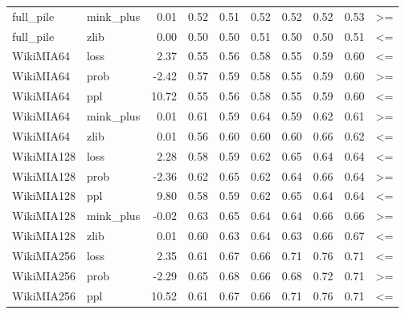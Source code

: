 \begin{tabular}{llrrrrrrrl}
 full\_pile & mink\_plus &           0.01 &           0.52 &     0.51 &      0.52 &          0.52 &    0.52 &     0.53 &                  >= \\
 full\_pile &      zlib &           0.00 &           0.50 &     0.50 &      0.51 &          0.50 &    0.50 &     0.51 &                  <= \\
 WikiMIA64 &      loss &           2.37 &           0.55 &     0.56 &      0.58 &          0.55 &    0.59 &     0.60 &                  <= \\
 WikiMIA64 &      prob &          -2.42 &           0.57 &     0.59 &      0.58 &          0.55 &    0.59 &     0.60 &                  >= \\
 WikiMIA64 &       ppl &          10.72 &           0.55 &     0.56 &      0.58 &          0.55 &    0.59 &     0.60 &                  <= \\
 WikiMIA64 & mink\_plus &           0.01 &           0.61 &     0.59 &      0.64 &          0.59 &    0.62 &     0.61 &                  >= \\
 WikiMIA64 &      zlib &           0.01 &           0.56 &     0.60 &      0.60 &          0.60 &    0.66 &     0.62 &                  <= \\
WikiMIA128 &      loss &           2.28 &           0.58 &     0.59 &      0.62 &          0.65 &    0.64 &     0.64 &                  <= \\
WikiMIA128 &      prob &          -2.36 &           0.62 &     0.65 &      0.62 &          0.64 &    0.66 &     0.64 &                  >= \\
WikiMIA128 &       ppl &           9.80 &           0.58 &     0.59 &      0.62 &          0.65 &    0.64 &     0.64 &                  <= \\
WikiMIA128 & mink\_plus &          -0.02 &           0.63 &     0.65 &      0.64 &          0.64 &    0.66 &     0.66 &                  >= \\
WikiMIA128 &      zlib &           0.01 &           0.60 &     0.63 &      0.64 &          0.63 &    0.66 &     0.67 &                  <= \\
WikiMIA256 &      loss &           2.35 &           0.61 &     0.67 &      0.66 &          0.71 &    0.76 &     0.71 &                  <= \\
WikiMIA256 &      prob &          -2.29 &           0.65 &     0.68 &      0.66 &          0.68 &    0.72 &     0.71 &                  >= \\
WikiMIA256 &       ppl &          10.52 &           0.61 &     0.67 &      0.66 &          0.71 &    0.76 &     0.71 &                  <= \\

\end{tabular}
